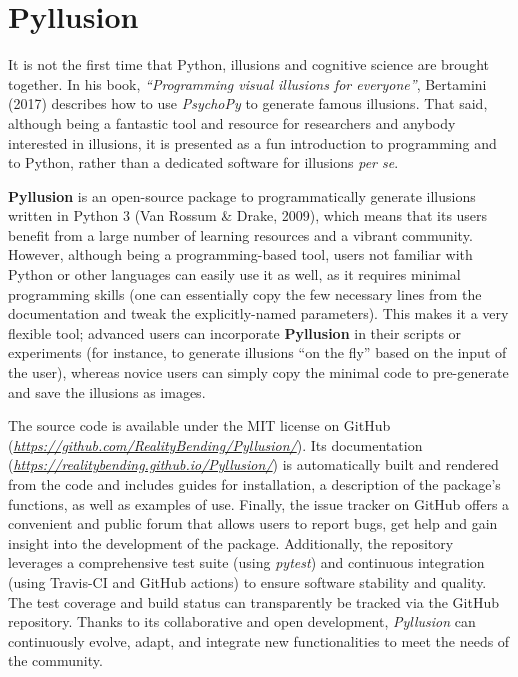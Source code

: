 \documentclass[
  english,
  man,floatsintext]{apa6}
\begin{document}
\hypertarget{pyllusion}{%
\section{Pyllusion}\label{pyllusion}}

It is not the first time that Python, illusions and cognitive science are brought together. In his book, \emph{``Programming visual illusions for everyone''}, Bertamini (2017) describes how to use \emph{PsychoPy} to generate famous illusions. That said, although being a fantastic tool and resource for researchers and anybody interested in illusions, it is presented as a fun introduction to programming and to Python, rather than a dedicated software for illusions \emph{per se}.

\textbf{Pyllusion} is an open-source package to programmatically generate illusions written in Python 3 (Van Rossum \& Drake, 2009), which means that its users benefit from a large number of learning resources and a vibrant community. However, although being a programming-based tool, users not familiar with Python or other languages can easily use it as well, as it requires minimal programming skills (one can essentially copy the few necessary lines from the documentation and tweak the explicitly-named parameters). This makes it a very flexible tool; advanced users can incorporate \textbf{Pyllusion} in their scripts or experiments (for instance, to generate illusions ``on the fly'' based on the input of the user), whereas novice users can simply copy the minimal code to pre-generate and save the illusions as images.

The source code is available under the MIT license on GitHub (\emph{\url{https://github.com/RealityBending/Pyllusion/}}). Its documentation (\emph{\url{https://realitybending.github.io/Pyllusion/}}) is automatically built and rendered from the code and includes guides for installation, a description of the package's functions, as well as examples of use. Finally, the issue tracker on GitHub offers a convenient and public forum that allows users to report bugs, get help and gain insight into the development of the package. Additionally, the repository leverages a comprehensive test suite (using \emph{pytest}) and continuous integration (using Travis-CI and GitHub actions) to ensure software stability and quality. The test coverage and build status can transparently be tracked via the GitHub repository. Thanks to its collaborative and open development, \emph{Pyllusion} can continuously evolve, adapt, and integrate new functionalities to meet the needs of the community.
\end{document}

